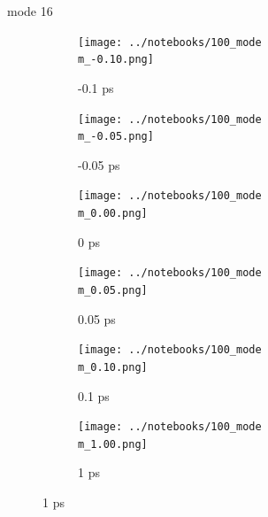 \documentclass{beamer}
\begin{document}
\renewcommand\m{16}
\begin{frame}{mode \m}
	\begin{figure}
		\centering
		\begin{subfigure}[b]{\w\textwidth}
			\centering
			\texttt{[image: ../notebooks/100\_mode\\m\_-0.10.png]}
			\caption{-0.1 ps}
		\end{subfigure}
		\begin{subfigure}[b]{\w\textwidth}
			\centering
			\texttt{[image: ../notebooks/100\_mode\\m\_-0.05.png]}
			\caption{-0.05 ps}
		\end{subfigure}
		\begin{subfigure}[b]{\w\textwidth}
			\centering
			\texttt{[image: ../notebooks/100\_mode\\m\_0.00.png]}
			\caption{0 ps}
		\end{subfigure}
		\begin{subfigure}[b]{\w\textwidth}
			\centering
			\texttt{[image: ../notebooks/100\_mode\\m\_0.05.png]}
			\caption{0.05 ps}
		\end{subfigure}
		\begin{subfigure}[b]{\w\textwidth}
			\centering
			\texttt{[image: ../notebooks/100\_mode\\m\_0.10.png]}
			\caption{0.1 ps}
		\end{subfigure}
		\begin{subfigure}[b]{\w\textwidth}
			\centering
			\texttt{[image: ../notebooks/100\_mode\\m\_1.00.png]}
			\caption{1 ps}
		\end{subfigure}
	\end{figure}
\end{frame}
\end{document}
